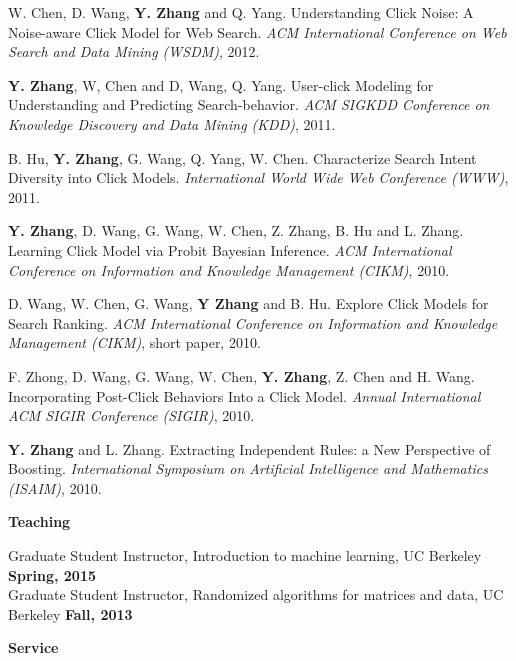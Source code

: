 \documentclass{res}
\begin{document}
\begin{resume}
\begin{enumerate}[label={[C\arabic*]}, ref={C\arabic*}]
\item  W. Chen, D. Wang, \textbf{Y. Zhang} and Q. Yang. Understanding Click Noise: A Noise-aware Click Model for Web Search.
\emph{ACM International Conference on Web Search and Data Mining (WSDM)}, 2012. \label{understanding-wsdm12}

\item  \textbf{Y. Zhang}, W, Chen and D, Wang, Q. Yang. User-click Modeling for Understanding and Predicting Search-behavior.
\emph{ACM SIGKDD Conference on Knowledge Discovery and Data Mining (KDD)}, 2011.\label{user-kdd11}
\item B. Hu, \textbf{Y. Zhang}, G. Wang, Q. Yang, W. Chen. Characterize Search Intent Diversity into Click Models.
\emph{International World Wide Web Conference (WWW)}, 2011. \label{characterize-www11}

\item \textbf{Y. Zhang}, D. Wang, G. Wang, W. Chen, Z. Zhang, B. Hu and L. Zhang. Learning Click Model via Probit Bayesian Inference.
\emph{ACM International Conference on Information and Knowledge Management (CIKM)}, 2010. \label{learning-cikm10}

\item D. Wang, W. Chen, G. Wang, \textbf{Y Zhang} and B. Hu. Explore Click Models for Search Ranking.
\emph{ACM International Conference on Information and Knowledge Management (CIKM)}, short paper, 2010. \label{explore-cikm10}

\item F. Zhong, D. Wang, G. Wang, W. Chen, \textbf{Y. Zhang}, Z. Chen and H. Wang. Incorporating Post-Click Behaviors Into a Click Model.
\emph{Annual International ACM SIGIR Conference (SIGIR)}, 2010. \label{incorporating-sigir10}

\item \textbf{Y. Zhang} and L. Zhang. Extracting Independent Rules: a New Perspective of Boosting. 
\emph{International Symposium on Artificial Intelligence and Mathematics (ISAIM)}, 2010. \label{a-new-isaim10}
\end{enumerate}

{\Large\bf Teaching}

\vspace{-5pt}
Graduate Student Instructor, Introduction to machine learning, UC Berkeley \hfill\textbf{Spring, 2015}\\
Graduate Student Instructor, Randomized algorithms for matrices and data, UC Berkeley \hfill\textbf{Fall, 2013}

{\Large\bf Service}


\end{resume}
\end{document}
